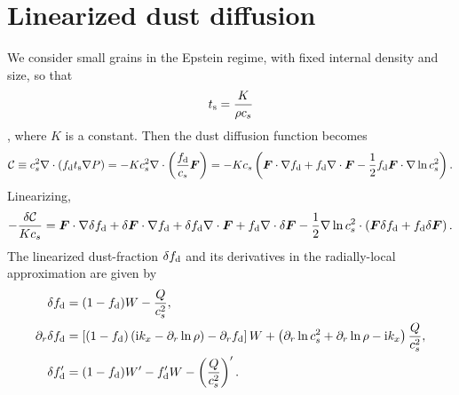 \section{Linearized dust diffusion}\label{lin_dust}
We consider small grains in the Epstein regime, with fixed internal
density and size, so that
\begin{align}
  t_\mathrm{s}  =  \frac{K}{\rho c_s}\label{epstein}
\end{align}
\citep{price15}, where $K$ is a constant. Then the dust diffusion
function becomes
\begin{align}
  \mathcal{C} \equiv c_s^2\nabla\cdot\left(f_\mathrm{d}t_\mathrm{s}\nabla
  P\right) = - K c_s^2 \nabla\cdot
  \left(\frac{f_\mathrm{d}}{c_s}\bm{F}\right) =
  -Kc_s \left(\bm{F}\cdot\nabla f_\mathrm{d} + f_\mathrm{d} \nabla\cdot\bm{F}
  - \frac{1}{2}f_\mathrm{d}\bm{F}\cdot\nabla\ln{c_s^2}\right).  
\end{align}
Linearizing,
\begin{align}
  - \frac{\delta\mathcal{C}}{Kc_s} = \bm{F}\cdot\nabla\delta f_\mathrm{d} +
  \delta\bm{F}\cdot\nabla f_\mathrm{d} + \delta f_\mathrm{d}\nabla\cdot\bm{F} +
  f_\mathrm{d}\nabla\cdot\delta\bm{F} -
  \frac{1}{2}\nabla\ln{c_s^2}\cdot\left(\bm{F}\delta f_\mathrm{d} + f_\mathrm{d}
  \delta\bm{F}\right). 
\end{align}
The linearized dust-fraction $\delta f_\mathrm{d}$ and its derivatives in the
radially-local approximation are given by
\begin{align}
  \delta f_\mathrm{d}      &= (1-f_\mathrm{d})W - \frac{Q}{c_s^2}, \\
  \partial_r\delta f_\mathrm{d} &= \left[(1-f_\mathrm{d})\left(\mathrm{i} k_x -
    \partial_r\ln{\rho}\right) - \partial_rf_\mathrm{d}\right]W + \left(\partial_r\ln{c_s^2}
  + \partial_r\ln{\rho} - \mathrm{i} k_x \right)\frac{Q}{c_s^2},\\
  \delta f_\mathrm{d}^\prime &= (1-f_\mathrm{d})W^\prime - f_\mathrm{d}^\prime W -
  \left(\frac{Q}{c_s^2}\right)^\prime. 
\end{align}


